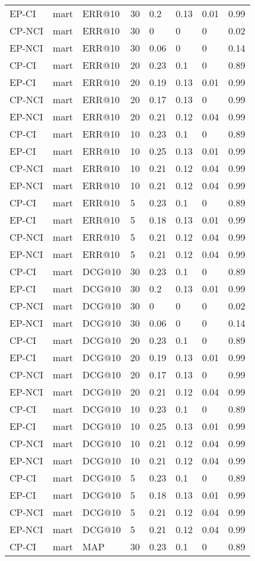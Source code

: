 \begin{landscape}
\begin{longtable}{|*{8}{l|}}
EP-CI&mart&ERR@10&30&0.2&0.13&0.01&0.99\\
CP-NCI&mart&ERR@10&30&0&0&0&0.02\\
EP-NCI&mart&ERR@10&30&0.06&0&0&0.14\\
\hline
CP-CI&mart&ERR@10&20&0.23&0.1&0&0.89\\
EP-CI&mart&ERR@10&20&0.19&0.13&0.01&0.99\\
CP-NCI&mart&ERR@10&20&0.17&0.13&0&0.99\\
EP-NCI&mart&ERR@10&20&0.21&0.12&0.04&0.99\\
\hline
CP-CI&mart&ERR@10&10&0.23&0.1&0&0.89\\
EP-CI&mart&ERR@10&10&0.25&0.13&0.01&0.99\\
CP-NCI&mart&ERR@10&10&0.21&0.12&0.04&0.99\\
EP-NCI&mart&ERR@10&10&0.21&0.12&0.04&0.99\\
\hline
CP-CI&mart&ERR@10&5&0.23&0.1&0&0.89\\
EP-CI&mart&ERR@10&5&0.18&0.13&0.01&0.99\\
CP-NCI&mart&ERR@10&5&0.21&0.12&0.04&0.99\\
EP-NCI&mart&ERR@10&5&0.21&0.12&0.04&0.99\\
\hline
CP-CI&mart&DCG@10&30&0.23&0.1&0&0.89\\
EP-CI&mart&DCG@10&30&0.2&0.13&0.01&0.99\\
CP-NCI&mart&DCG@10&30&0&0&0&0.02\\
EP-NCI&mart&DCG@10&30&0.06&0&0&0.14\\
\hline
CP-CI&mart&DCG@10&20&0.23&0.1&0&0.89\\
EP-CI&mart&DCG@10&20&0.19&0.13&0.01&0.99\\
CP-NCI&mart&DCG@10&20&0.17&0.13&0&0.99\\
EP-NCI&mart&DCG@10&20&0.21&0.12&0.04&0.99\\
\hline
CP-CI&mart&DCG@10&10&0.23&0.1&0&0.89\\
EP-CI&mart&DCG@10&10&0.25&0.13&0.01&0.99\\
CP-NCI&mart&DCG@10&10&0.21&0.12&0.04&0.99\\
EP-NCI&mart&DCG@10&10&0.21&0.12&0.04&0.99\\
\hline
CP-CI&mart&DCG@10&5&0.23&0.1&0&0.89\\
EP-CI&mart&DCG@10&5&0.18&0.13&0.01&0.99\\
CP-NCI&mart&DCG@10&5&0.21&0.12&0.04&0.99\\
EP-NCI&mart&DCG@10&5&0.21&0.12&0.04&0.99\\
\hline
CP-CI&mart&MAP&30&0.23&0.1&0&0.89\\

\end{longtable}
\end{landscape}
